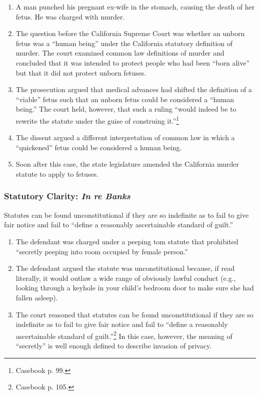 \begin{enumerate}
    \item A man punched his pregnant ex-wife in the stomach, causing the death 
    of her fetus. He was charged with murder.
    \item The question before the California Supreme Court was whether an 
    unborn fetus was a ``human being'' under the California statutory 
    definition of murder. The court examined common law definitions of 
    murder and concluded that it was intended to protect people who had been 
    ``born alive'' but that it did not protect unborn fetuses.
    \item The prosecution argued that medical advances had shifted the 
    definition of a ``viable'' fetus such that an unborn fetus could be 
    considered a ``human being.'' The court held, however, that such a ruling 
    ``would indeed be to rewrite the statute under the guise of construing 
    it.''\footnote{Casebook p. 99.}
    \item The dissent argued a different interpretation of common law in which 
    a ``quickened'' fetus could be considered a human being.
    \item Soon after this case, the state legislature amended the California 
    murder statute to apply to fetuses.
\end{enumerate}

\subsubsection{Statutory Clarity: \emph{In re Banks}}

Statutes can be found unconstitutional if they are so indefinite as to fail to 
give fair notice and fail to ``define a reasonably ascertainable standard of 
guilt.''

\begin{enumerate}
    \item The defendant was charged under a peeping tom statute that 
    prohibited ``secretly peeping into room occupied by female person.''
    \item The defendant argued the statute was unconstitutional because, if 
    read literally, it would outlaw a wide range of obviously lawful conduct 
    (e.g., looking through a keyhole in your child's bedroom door to make sure 
    she had fallen asleep).
    \item The court reasoned that statutes can be found unconstitutional if 
    they are so indefinite as to fail to give fair notice and fail to ``define 
    a reasonably ascertainable standard of guilt.''\footnote{Casebook p. 105.} 
    In this case, however, the meaning of ``secretly'' is well enough defined 
    to describe invasion of privacy.
\end{enumerate}


